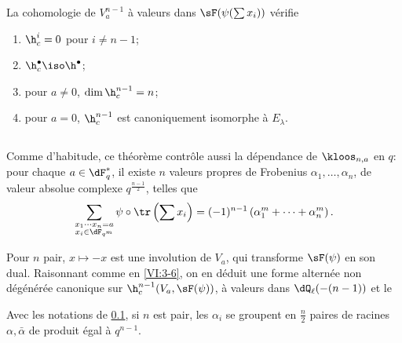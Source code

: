 \begin{theorem_}\label{VI:7-4}
La cohomologie de $V_a^{n-1}$ à valeurs dans $\sF(\psi(\sum x_i))$ vérifie 
\begin{enumerate}[\indent (i)]
  \item $\h_c^i=0$ pour $i\ne n-1$; 
  \item $\h_c^\bullet{} \iso \h^\bullet{}$; 
  \item pour $a\ne 0$, $\dim \h_c^{n-1}{}=n$; 
  
\item {}pour $a=0$, $\h_c^{n-1}{}$ est canoniquement isomorphe à $E_\lambda$. 
\end{enumerate}
\end{theorem_}





\subsection{}\label{VI:7-5}

Comme d'habitude, ce théorème contrôle aussi la dépendance de 
$\kloos_{n,a}$ en $q$: pour chaque $a\in \dF_q^\ast$, il existe $n$ valeurs 
propres de Frobenius $\alpha_1,\dots,\alpha_n$, de valeur absolue complexe 
$q^{\frac{n-1}{2}}$, telles que 
\[
  \sum_{\substack{x_1\dotsm x_n = a \\ x_i\in \dF_{q^m}}} \psi\circ \tr\left(\sum x_i\right) = (-1)^{n-1} \left(\alpha_1^m + \cdots + \alpha_n^m \right) \text{.} 
\]

Pour $n$ pair, $x\mapsto -x$ est une involution de $V_a$, qui transforme 
$\sF(\psi)$ en son dual. Raisonnant comme en \ref{VI:3-6}, on en déduit une 
forme alternée non dégénérée canonique sur $\h_c^{n-1}(V_a,\sF(\psi))$, 
à valeurs dans $\dQ_\ell(-(n-1))$ et le 





\begin{corollary_}\label{VI:7-6}
Avec les notations de \ref{VI:7-5}, si $n$ est pair, les $\alpha_i$ se groupent 
en $\frac n 2$ paires de racines $\alpha,\bar\alpha$ de produit égal à 
$q^{n-1}$. 
\end{corollary_}





\subsection{}\label{VI:7-7}


